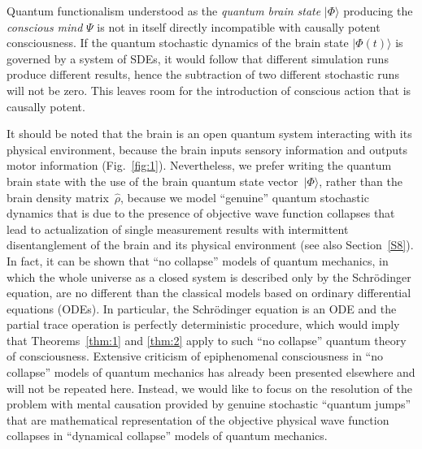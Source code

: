 \documentclass{ws-ijmpb}
\begin{document}
Quantum functionalism understood as the \emph{quantum brain state}
$\vert \Phi\rangle$ producing the \emph{conscious mind} $\Psi$ is not in itself directly
incompatible with causally potent consciousness. If the quantum
stochastic dynamics of the brain state $\vert \Phi(t)\rangle$ is governed
by a system of SDEs, it would follow that different simulation runs
produce different results, hence the subtraction of two different
stochastic runs will not be zero. This leaves room for the introduction of conscious
action that is causally potent.

It should be noted that the brain is an open quantum system interacting with its physical environment, because the brain inputs sensory information and outputs motor information (Fig.~\ref{fig:1}). Nevertheless, we prefer writing the quantum brain state with the use of the brain quantum state vector~$\vert \Phi\rangle$, rather than the brain density matrix~$\hat{\rho}$, because we model ``genuine'' quantum stochastic dynamics that is due to the presence of objective wave function collapses \cite{Ghirardi1986,Ghirardi1990,Bassi2003} that lead to actualization of single measurement results with intermittent disentanglement of the brain and its physical environment \cite{Georgiev2017} (see also Section~\ref{S8}).
In fact, it can be shown that ``no collapse'' models of quantum mechanics, in which the whole universe as a closed system is described only by the Schr\"{o}dinger equation, are no different than the classical models based on ordinary differential equations (ODEs). In particular, the Schr\"{o}dinger equation is an ODE and the partial trace operation is perfectly deterministic procedure, which would imply that Theorems~\ref{thm:1} and \ref{thm:2} apply to such ``no collapse'' quantum theory of consciousness. Extensive criticism of epiphenomenal consciousness in ``no collapse'' models of quantum mechanics has already been presented elsewhere \cite{Georgiev2017} and will not be repeated here. Instead, we would like to focus on the resolution of the problem with mental causation provided by genuine stochastic ``quantum jumps'' that are mathematical representation of the objective physical wave function collapses in ``dynamical collapse'' models of quantum mechanics.
\end{document}

